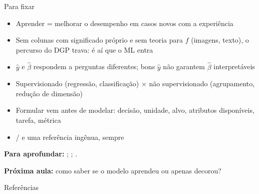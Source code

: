 \documentclass[aspectratio=169,11pt]{beamer}
\begin{document}
\begin{frame}{Para fixar}
  \begin{itemize}\small
    \item Aprender = melhorar o desempenho em \alert{casos novos} com a experiência
    \item Sem colunas com significado próprio e sem teoria para $f$ (imagens,
          texto), o percurso do DGP trava: é aí que o ML entra
    \item $\hat y$ e $\hat\beta$ respondem a perguntas diferentes; bons $\hat y$ não
          garantem $\hat\beta$ interpretáveis
    \item Supervisionado (regressão, classificação) $\times$ não supervisionado
          (agrupamento, redução de dimensão)
    \item Formular vem antes de modelar: decisão, unidade, alvo, atributos
          \alert{disponíveis}, tarefa, métrica
    \item {} /  e uma referência ingênua, sempre
  \end{itemize}
  \medskip
  \small\textbf{Para aprofundar:} \textcite{mullainathan2017}; \textcite[cap.~2]{james2021};
  \textcite{breiman2001cultures}.
  \smallskip

  \textbf{Próxima aula:} como saber se o modelo aprendeu ou apenas decorou?
\end{frame}

\begin{frame}{Referências}
  \printbibliography[heading=none]
\end{frame}
\end{document}
